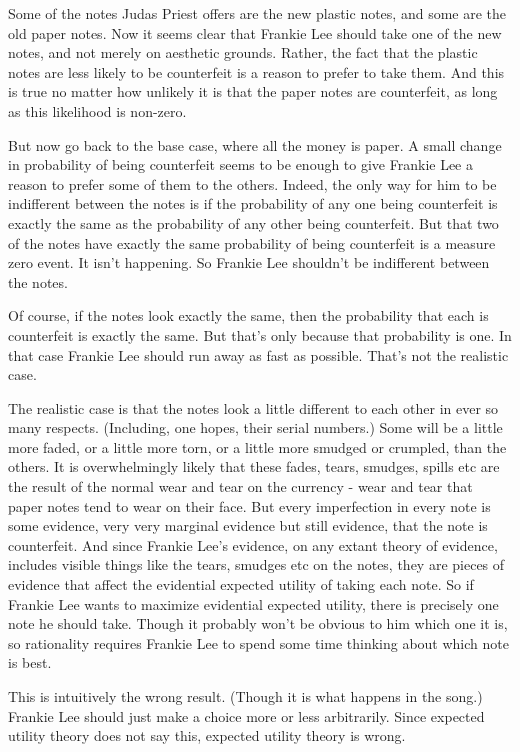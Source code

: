 \documentclass[
  10pt,
  letterpaper,
  DIV=11,
  numbers=noendperiod,
  twoside]{scrartcl}
\begin{document}
Some of the notes Judas Priest offers are the new plastic notes, and
some are the old paper notes. Now it seems clear that Frankie Lee should
take one of the new notes, and not merely on aesthetic grounds. Rather,
the fact that the plastic notes are less likely to be counterfeit is a
reason to prefer to take them. And this is true no matter how unlikely
it is that the paper notes are counterfeit, as long as this likelihood
is non-zero.

But now go back to the base case, where all the money is paper. A small
change in probability of being counterfeit seems to be enough to give
Frankie Lee a reason to prefer some of them to the others. Indeed, the
only way for him to be indifferent between the notes is if the
probability of any one being counterfeit is exactly the same as the
probability of any other being counterfeit. But that two of the notes
have exactly the same probability of being counterfeit is a measure zero
event. It isn't happening. So Frankie Lee shouldn't be indifferent
between the notes.

Of course, if the notes look exactly the same, then the probability that
each is counterfeit is exactly the same. But that's only because that
probability is one. In that case Frankie Lee should run away as fast as
possible. That's not the realistic case.

The realistic case is that the notes look a little different to each
other in ever so many respects. (Including, one hopes, their serial
numbers.) Some will be a little more faded, or a little more torn, or a
little more smudged or crumpled, than the others. It is overwhelmingly
likely that these fades, tears, smudges, spills etc are the result of
the normal wear and tear on the currency - wear and tear that paper
notes tend to wear on their face. But every imperfection in every note
is some evidence, very very marginal evidence but still evidence, that
the note is counterfeit. And since Frankie Lee's evidence, on any extant
theory of evidence, includes visible things like the tears, smudges etc
on the notes, they are pieces of evidence that affect the evidential
expected utility of taking each note. So if Frankie Lee wants to
maximize evidential expected utility, there is precisely one note he
should take. Though it probably won't be obvious to him which one it is,
so rationality requires Frankie Lee to spend some time thinking about
which note is best.

This is intuitively the wrong result. (Though it is what happens in the
song.) Frankie Lee should just make a choice more or less arbitrarily.
Since expected utility theory does not say this, expected utility theory
is wrong.
\end{document}
